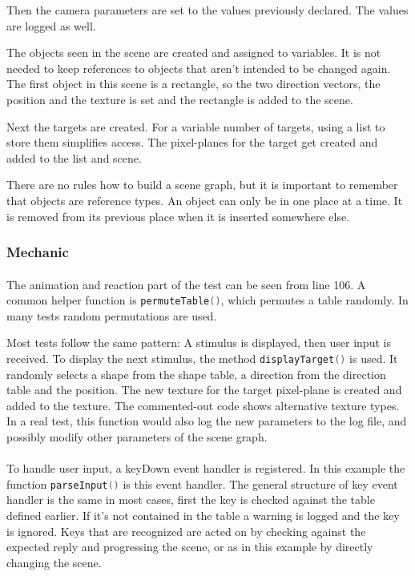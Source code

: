 Then the camera parameters are set to the values previously declared.
The values are logged as well.

The objects seen in the scene are created and assigned to variables.
It is not needed to keep references to objects that aren't intended to be changed again.
The first object in this scene is a rectangle, so the two direction vectors, the position and the texture is set and the rectangle is added to the scene.

Next the targets are created.
For a variable number of targets, using a list to store them simplifies access.
The pixel-planes for the target get created and added to the list and scene.

There are no rules how to build a scene graph, but it is important to remember that objects are reference types.
An object can only be in one place at a time.
It is removed from its previous place when it is inserted somewhere else.

\subsubsection{Mechanic}
\paragraph{}
The animation and reaction part of the test can be seen from line 106.
A common helper function is \lstinline[language=lua]{permuteTable()}, which permutes a table randomly.
In many tests random permutations are used.

Most tests follow the same pattern: A stimulus is displayed, then user input is received.
To display the next stimulus, the method \lstinline[language=lua]{displayTarget()} is used.
It randomly selects a shape from the shape table, a direction from the direction table and the position.
The new texture for the target pixel-plane is created and added to the texture.
The commented-out code shows alternative texture types.
In a real test, this function would also log the new parameters to the log file, and possibly modify other parameters of the scene graph.

\paragraph{}
To handle user input, a keyDown event handler is registered.
In this example the function \lstinline[language=lua]{parseInput()} is this event handler.
The general structure of key event handler is the same in most cases, first the key is checked against the table defined earlier.
If it's not contained in the table a warning is logged and the key is ignored.
Keys that are recognized are acted on by checking against the expected reply and progressing the scene, or as in this example by directly changing the scene.

